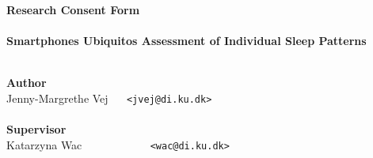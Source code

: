 \documentclass[a4paper,oneside]{memoir}
\begin{document}
    \thispagestyle{empty}
    \begin{adjustwidth}{-3cm}{-1.5cm}
    \vspace*{1.6cm}
    \textbf{\Huge Research Consent Form} \\
    \vspace*{1.5cm} \\
    \textbf{\Huge Smartphones Ubiquitos Assessment of Individual Sleep Patterns} \\
    \vspace*{.1cm} \\
    \begin{tabbing}
    \textbf{\Large Author} \\
    Jenny-Margrethe Vej ~~ \= \texttt{<jvej@di.ku.dk>} \\
    \vspace*{.1cm} \\
    \textbf{\Large Supervisor} \\
    Katarzyna Wac ~~~~~~~~~~~ \= \texttt{<wac@di.ku.dk>} \\
    \vspace*{.1cm} \\
    \\[11cm]
    \end{tabbing}
    \end{adjustwidth}
    \ClearWallPaper
\end{document}
